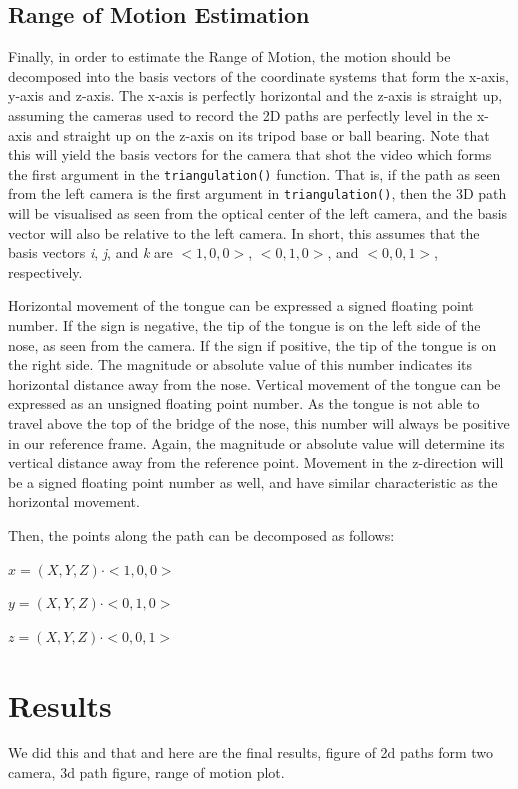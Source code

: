 \documentclass[journal]{IEEEtran}
\begin{document}
\subsection{Range of Motion Estimation}
Finally, in order to estimate the Range of Motion, the motion should be decomposed into the basis vectors of the coordinate systems that form the x-axis, y-axis and z-axis. The x-axis is perfectly horizontal and the z-axis is straight up, assuming the cameras used to record the 2D paths are perfectly level in the x-axis and straight up on the z-axis on its tripod base or ball bearing. Note that this will yield the basis vectors for the camera that shot the video which forms the first argument in the \texttt{triangulation()} function. That is, if the path as seen from the left camera is the first argument in \texttt{triangulation()}, then the 3D path will be visualised as seen from the optical center of the left camera, and the basis vector will also be relative to the left camera. In short, this assumes that the basis vectors \emph{i}, \emph{j}, and \emph{k} are $<1, 0, 0>$, $<0, 1, 0>$, and $<0, 0, 1>$, respectively.

Horizontal movement of the tongue can be expressed a signed floating point number. If the sign is negative, the tip of the tongue is on the left side of the nose, as seen from the camera. If the sign if positive, the tip of the tongue is on the right side. The magnitude or absolute value of this number indicates its horizontal distance away from the nose.
Vertical movement of the tongue can be expressed as an unsigned floating point number. As the tongue is not able to travel above the top of the bridge of the nose, this number will always be positive in our reference frame. Again, the magnitude or absolute value will determine its vertical distance away from the reference point.
Movement in the z-direction will be a signed floating point number as well, and have similar characteristic as the horizontal movement.

Then, the points along the path can be decomposed as follows:

$x = (X, Y, Z)  \cdot <1, 0, 0>$

$y = (X, Y, Z)  \cdot <0, 1, 0>$

$z = (X, Y, Z)  \cdot <0, 0, 1>$

\section{Results}
We did this and that and here are the final results, figure of 2d paths form two camera, 3d path figure, range of motion plot.
\end{document}
